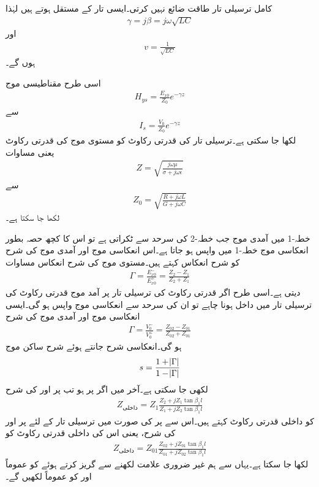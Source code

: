 کامل ترسیلی تار طاقت ضائع نہیں کرتی۔ایسی تار کے مستقل  ہوتے ہیں لہٰذا
\begin{align*}
\gamma=j \beta=j \omega \sqrt{LC}
\end{align*}
اور 
\begin{align}
v=\frac{1}{\sqrt{LC}}
\end{align}
ہوں گے۔

اسی طرح مقناطیسی موج
\begin{align*}
H_{ys}=\frac{E_{x0}}{Z_0} e^{-\gamma z}
\end{align*}
سے
\begin{align}
I_s=\frac{V_0}{Z_0} e^{-\gamma z}
\end{align}
لکھا جا سکتی ہے۔ترسیلی تار کی قدرتی رکاوٹ  کو مستوی موج کی قدرتی رکاوٹ یعنی مساوات 
\begin{align*}
Z=\sqrt{\frac{j\omega \mu}{\sigma +j\omega \epsilon}}
\end{align*}
سے
\begin{align}
Z_0=\sqrt{\frac{R+j\omega L}{G+j \omega C}}
\end{align}
لکھا جا سکتا ہے۔

خطہ-1 میں آمدی موج جب خطہ-2 کی سرحد سے ٹکراتی ہے تو اس کا کچھ حصہ بطور انعکاسی موج خطہ-1 میں واپس ہو جاتا ہے۔اس انعکاسی موج اور آمدی موج کی شرح کو شرح انعکاس کہتے ہیں۔مستوی موج کی شرح انعکاس مساوات 
\begin{align*}
\Gamma=\frac{E_{x0}^-}{E_{x0}^+}=\frac{Z_2-Z_1}{Z_2+Z_1}
\end{align*}
دیتی ہے۔اسی طرح اگر  قدرتی رکاوٹ کی ترسیلی تار پر آمد موج  قدرتی رکاوٹ کی ترسیلی تار میں داخل ہونا چاہے تو ان کی سرحد سے انعکاسی موج واپس ہو گی۔ایسی انعکاسی موج اور آمدی موج کی شرح
\begin{align}
\Gamma=\frac{V_0^-}{V_0^+}=\frac{Z_{02}-Z_{01}}{Z_{02}+Z_{01}}
\end{align}
 ہو گی۔انعکاسی شرح جانتے ہوئے شرح ساکن موج
\begin{align}
s=\frac{1+\abs{\Gamma}}{1-\abs{\Gamma}}
\end{align}
لکھی جا سکتی ہے۔آخر میں اگر  پر  ہو تب  پر  اور  کی شرح 
\begin{align*}
Z_{\text{داخلی}}=Z_1 \frac{Z_2+j Z_1 \tan \beta_1 l}{Z_1 +j Z_2 \tan \beta_1 l}
\end{align*}
کو داخلی قدرتی رکاوٹ  کہتے ہیں۔اس سے  پر  کی صورت میں ترسیلی تار کے لئے  پر  اور  کی شرح، یعنی اس کی داخلی قدرتی رکاوٹ کو
\begin{align}\label{مساوات_ترسیلی_داخلی_قدرتی_رکاوٹ_تعریف}
Z_{\text{داخلی}}=Z_{01} \frac{Z_{02}+j Z_{01}\tan \beta_1 l}{Z_{01}+j Z_{02}\tan \beta_1 l}
\end{align}
لکھا جا سکتا ہے۔یہاں سے ہم غیر ضروری علامت لکھنے سے گریز کرتے ہوئے  کو عموماً  اور  کو عموماً  لکھیں گے۔



